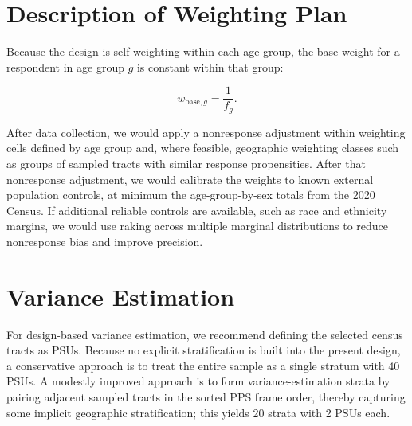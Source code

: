 \documentclass[
  11pt,
  letterpaper,
  DIV=11,
  numbers=noendperiod]{scrartcl}
\begin{document}
\section{Description of Weighting
Plan}\label{description-of-weighting-plan}

Because the design is self-weighting within each age group, the base
weight for a respondent in age group \(g\) is constant within that
group:

\[
w_{\text{base},g} = \frac{1}{f_g}.
\]

\begin{table}[!h]
\centering
\caption{\label{tab:weighting-table}Base Weights by Age Group}
\centering
{}
\end{table}

After data collection, we would apply a nonresponse adjustment within
weighting cells defined by age group and, where feasible, geographic
weighting classes such as groups of sampled tracts with similar response
propensities. After that nonresponse adjustment, we would calibrate the
weights to known external population controls, at minimum the
age-group-by-sex totals from the 2020 Census. If additional reliable
controls are available, such as race and ethnicity margins, we would use
raking across multiple marginal distributions to reduce nonresponse bias
and improve precision.

\section{Variance Estimation}\label{variance-estimation}

For design-based variance estimation, we recommend defining the selected
census tracts as PSUs. Because no explicit stratification is built into
the present design, a conservative approach is to treat the entire
sample as a single stratum with 40 PSUs. A modestly improved approach is
to form variance-estimation strata by pairing adjacent sampled tracts in
the sorted PPS frame order, thereby capturing some implicit geographic
stratification; this yields 20 strata with 2 PSUs each.
\end{document}
